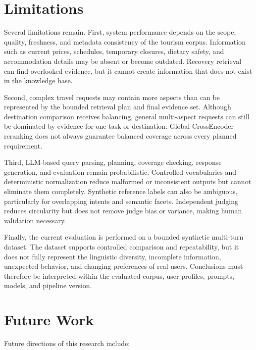\section*{Limitations}

Several limitations remain. First, system performance depends on the scope,
quality, freshness, and metadata consistency of the tourism corpus. Information
such as current prices, schedules, temporary closures, dietary safety, and
accommodation details may be absent or become outdated. Recovery retrieval can
find overlooked evidence, but it cannot create information that does not exist
in the knowledge base.

Second, complex travel requests may contain more aspects than can be represented
by the bounded retrieval plan and final evidence set. Although destination
comparison receives balancing, general multi-aspect requests can still be
dominated by evidence for one task or destination. Global CrossEncoder
reranking does not always guarantee balanced coverage across every planned
requirement.

Third, LLM-based query parsing, planning, coverage checking, response
generation, and evaluation remain probabilistic. Controlled vocabularies and
deterministic normalization reduce malformed or inconsistent outputs but cannot
eliminate them completely. Synthetic reference labels can also be ambiguous,
particularly for overlapping intents and semantic facets. Independent judging
reduces circularity but does not remove judge bias or variance, making human
validation necessary.

Finally, the current evaluation is performed on a bounded synthetic multi-turn
dataset. The dataset supports controlled comparison and repeatability, but it
does not fully represent the linguistic diversity, incomplete information,
unexpected behavior, and changing preferences of real users. Conclusions must
therefore be interpreted within the evaluated corpus, user profiles, prompts,
models, and pipeline version.

\section*{Future Work}

Future directions of this research include:

